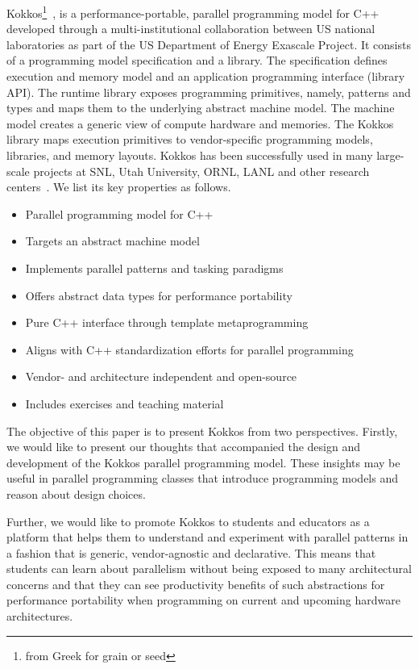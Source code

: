Kokkos\footnote{from Greek for grain or seed}~\cite{KOKKOS}, is a performance-portable, parallel programming model for C++ developed through a multi-institutional collaboration between US national laboratories as part of the US Department of Energy Exascale Project\cite{ECP}. It consists of a programming model specification and a library. The specification defines execution and memory model and an application programming interface (library API). The runtime library exposes programming primitives, namely, patterns and types and maps them to the underlying abstract machine model. The machine model creates a generic view of compute hardware and memories. The Kokkos library maps execution primitives to vendor-specific programming models, libraries, and memory layouts. Kokkos has been successfully used in many large-scale projects at SNL, Utah University, ORNL, LANL and other research centers~\cite{KOKKOSUSECASE2}. We list its key properties as follows.

\begin{itemize}
\item Parallel programming model for C++
\item Targets an abstract machine model
\item Implements parallel patterns and tasking paradigms
\item Offers abstract data types for performance portability
\item Pure C++ interface through template metaprogramming
\item Aligns with C++ standardization efforts for parallel programming
\item Vendor- and architecture independent and open-source
\item Includes exercises and teaching material
\end{itemize}

The objective of this paper is to present Kokkos from two perspectives. Firstly, we would like to present our thoughts that accompanied the design and development of the Kokkos parallel programming model. These insights may be  useful in parallel programming classes that introduce programming models and reason about design choices.
 
Further, we would like to promote Kokkos to students and educators as a platform that helps them to understand and experiment with parallel patterns in a fashion that is generic, vendor-agnostic and declarative. This means that students can learn about parallelism without being exposed to many architectural concerns and that they can see productivity benefits of such abstractions for performance portability when programming on current and upcoming hardware architectures.

